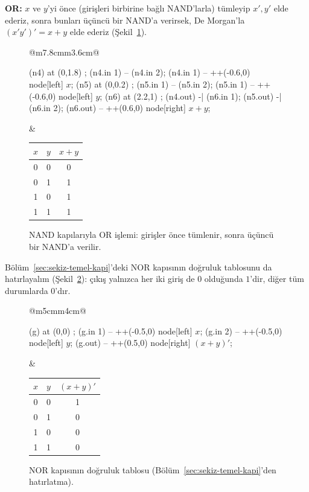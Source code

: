 \textbf{OR:} $x$ ve $y$'yi önce (girişleri birbirine bağlı NAND'larla) tümleyip $x',y'$
elde ederiz, sonra bunları üçüncü bir NAND'a verirsek, De Morgan'la $(x'y')'=x+y$ elde
ederiz (Şekil~\ref{fig:nand-or}).

\begin{figure}[H]
\centering
\begin{tabular}{@{}m{7.8cm}m{3.6cm}@{}}
\begin{circuitikz}[scale=1.3, font=\normalsize]
\node[nand port, number inputs=2] (n4) at (0,1.8) {};
\draw (n4.in 1) -- (n4.in 2);
\draw (n4.in 1) -- ++(-0.6,0) node[left] {$x$};
\node[nand port, number inputs=2] (n5) at (0,0.2) {};
\draw (n5.in 1) -- (n5.in 2);
\draw (n5.in 1) -- ++(-0.6,0) node[left] {$y$};
\node[nand port, number inputs=2] (n6) at (2.2,1) {};
\draw (n4.out) -| (n6.in 1);
\draw (n5.out) -| (n6.in 2);
\draw (n6.out) -- ++(0.6,0) node[right] {$x+y$};
\end{circuitikz}
&
\begin{tabular}{cc|c}
\toprule
$x$&$y$&$x+y$\\
\midrule
0&0&0\\0&1&1\\1&0&1\\1&1&1\\
\bottomrule
\end{tabular}
\end{tabular}
\caption{NAND kapılarıyla OR işlemi: girişler önce tümlenir, sonra üçüncü bir NAND'a
verilir.}
\label{fig:nand-or}
\end{figure}

Bölüm~\ref{sec:sekiz-temel-kapi}'deki NOR kapısının doğruluk tablosunu da hatırlayalım
(Şekil~\ref{fig:kapi-nor-hatirlatma}): çıkış yalnızca her iki giriş de $0$ olduğunda
$1$'dir, diğer tüm durumlarda $0$'dır.

\begin{figure}[H]
\centering
\begin{tabular}{@{}m{5cm}m{4cm}@{}}
\begin{circuitikz}[scale=1, font=\small]
\node[nor port, number inputs=2] (g) at (0,0) {};
\draw (g.in 1) -- ++(-0.5,0) node[left] {$x$};
\draw (g.in 2) -- ++(-0.5,0) node[left] {$y$};
\draw (g.out) -- ++(0.5,0) node[right] {$(x+y)'$};
\end{circuitikz}
&
\begin{tabular}{cc|c}
\toprule
$x$&$y$&$(x+y)'$\\
\midrule
0&0&1\\0&1&0\\1&0&0\\1&1&0\\
\bottomrule
\end{tabular}
\end{tabular}
\caption{NOR kapısının doğruluk tablosu (Bölüm~\ref{sec:sekiz-temel-kapi}'den hatırlatma).}
\label{fig:kapi-nor-hatirlatma}
\end{figure}

